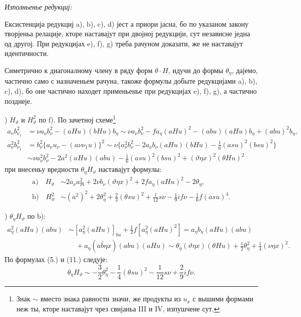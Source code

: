 ﻿\documentclass[11pt]{article}
\newcommand{\R}{\mathfrak R}
\begin{document}
\noindent\textit{Изполньенье редукциј:}

Ексистенција редукциј \mbox{a)}, \mbox{b)}, \mbox{c)}, \mbox{d)} јест а приори јасна, бо по указаном закону творјеньа релације, кторе наставајут при двојној редукцији, сут независне једна од другој. При редукцијах \mbox{e)}, \mbox{f)}, \mbox{g)} треба рачуном доказати, же не наставајут идентичности.

Симетрично к диагоналному члену в ряду форм $\theta\cdot H$, идучи до формы $\theta_\eta$, дајемо, частично само с назначеньем рачуна, такоже формулы добыте редукцијами \mbox{a)}, \mbox{b)}, \mbox{c)}, \mbox{d)}, бо оне частично находет применьенье при редукцијах \mbox{e)}, \mbox{f)}, \mbox{g)}, а частично позднеје.

) $H_\vartheta$ и $H_\vartheta^2$ по \mbox{f)}. По зачетној схеме\footnote{Знак $\sim$ вместо знака равности значи, же продукты из $u_x$ с вышими формами неж ты, кторе наставајут чрез свијаньа III и IV, изпушчене сут.}
\begingroup\small
\[
\begin{aligned}
a_\nu b_{\nu_1}^2
&=\nu a_\nu b_\nu^2-(aHu)(bHu)b_\eta
\sim \nu a_\nu b_\nu^2-f a_\eta(aHu)^2-(abu)(aHu)b_\eta+(abu)^2b_\eta,\\
a_\nu^2b_{\nu_1}^2
&=b_\nu^2\{a_\nu u_\nu-(a\nu\nu_1u)\}^2
\sim \nu\{a_\nu^2b_\nu^2-2a_\nu b_\nu(aHu)(bHu)
-\frac16(asu)^2(bsu)^2\}\\
&\sim \nu a_\nu^2b_\nu^2-2a^2(aHu)(abu)-\frac16(asu)^2(bsu)^2+(\vartheta\eta x)^2(\theta Hu)^2
\end{aligned}
\]
\endgroup
при внесеньу вредности $\theta_\eta H_\vartheta$ наставајут формулы:
\[
\tag{12}
\begin{aligned}
\mathrm{a)}\quad H_\vartheta&\sim 2a_\nu a_\R^2+2\nu b_\nu(\vartheta\eta x)^2+2f a_\eta(aHu)^2-2\theta_\eta,\\
\mathrm{b)}\quad H_\vartheta^2&\sim (a^2)^2+2\theta_\eta^2+\frac23(\theta su)^2
+\frac1{12}s\nu-\frac19if\nu-\frac16f(asu)^4.
\end{aligned}
\]

) $\theta_\eta H_\vartheta$ по \mbox{b)}:
\begingroup\small
\[
\begin{aligned}
a_\eta^2(aHu)(abu)&\sim [a_\eta^2(aHu)]_{bu}+\frac12 f[a_\eta^2(aHu)^2]
=a_\eta b_\eta(aHu)(abu)\\
&\quad+a_\eta(a\widehat{b}\eta x)(abu)(aHu)
\sim \theta_\eta(\vartheta\eta x)(\theta Hu)+\frac12\theta_\eta^2+\frac14(\nu\eta x)^2.
\end{aligned}
\]
\endgroup
По формулах (5.) и (11.) следује:
\[
\theta_\eta H_\vartheta\sim -\frac32\theta_\eta^2-\frac14(\theta su)^2-\frac1{12}s\nu+\frac29if\nu.
\]
\end{document}
